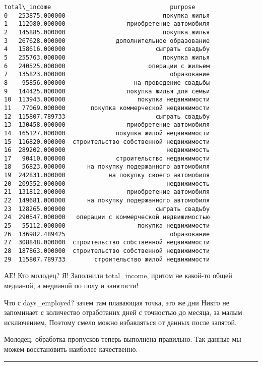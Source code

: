 \documentclass[11pt]{article}
\begin{document}
\begin{tcolorbox}[breakable, boxrule=.5pt, size=fbox, pad at break*=1mm, opacityfill=0]
\begin{Verbatim}[commandchars=\\\{\}]
     total\_income                                 purpose
0   253875.000000                           покупка жилья
1   112080.000000                 приобретение автомобиля
2   145885.000000                           покупка жилья
3   267628.000000              дополнительное образование
4   158616.000000                         сыграть свадьбу
5   255763.000000                           покупка жилья
6   240525.000000                       операции с жильем
7   135823.000000                             образование
8    95856.000000                   на проведение свадьбы
9   144425.000000                 покупка жилья для семьи
10  113943.000000                    покупка недвижимости
11   77069.000000       покупка коммерческой недвижимости
12  115807.789733                         сыграть свадьбу
13  130458.000000                 приобретение автомобиля
14  165127.000000              покупка жилой недвижимости
15  116820.000000  строительство собственной недвижимости
16  289202.000000                            недвижимость
17   90410.000000              строительство недвижимости
18   56823.000000      на покупку подержанного автомобиля
19  242831.000000            на покупку своего автомобиля
20  209552.000000                            недвижимость
21  131812.000000                 приобретение автомобиля
22  149681.000000      на покупку подержанного автомобиля
23  128265.000000                         сыграть свадьбу
24  290547.000000   операции с коммерческой недвижимостью
25   55112.000000                    покупка недвижимости
26  136982.489425                             образование
27  308848.000000  строительство собственной недвижимости
28  187863.000000  строительство собственной недвижимости
29  115807.789733        строительство жилой недвижимости
\end{Verbatim}
\end{tcolorbox}
        
    АЕ! Кто молодец? Я! Заполнили total\_income, притом не какой-то общей
медианой, а медианой по полу и занятости!

    Что с days\_employed? зачем там плавающая точка, это же дни Никто не
запоминает с количество отработаннх дней с точностью до месяца, за малым
исключением, Поэтому смело можно избавляться от данных после запятой.

    Молодец, обработка пропусков теперь выполнена правильно. Так данные мы
можем восстановить наиболее качественно.

\begin{center}\rule{0.5\linewidth}{0.5pt}\end{center}
\end{document}
